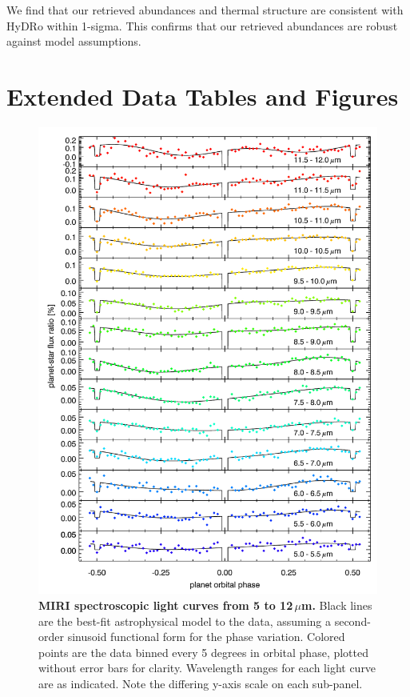 \documentclass[pdflatex,sn-standardnature]{sn-jnl}%
\begin{document}
We find that our retrieved abundances and thermal structure are consistent with HyDRo within 1-sigma. This confirms that our retrieved abundances are robust against model assumptions.





\section*{Extended Data Tables and Figures}

\begin{figure}[h!]
    \centering
\includegraphics[width=\linewidth]{spectral_phase_curves.pdf}
\caption{\textbf{MIRI spectroscopic light curves from 5 to 12\,$\mu$m.} Black lines are the best-fit astrophysical model to the data, assuming a second-order sinusoid functional form for the phase variation.  Colored points are the data binned every 5 degrees in orbital phase, plotted without error bars for clarity.  Wavelength ranges for each light curve are as indicated.  Note the differing y-axis scale on each sub-panel.}
    \label{fig:spectroscopic_lc} 
\end{figure}
\end{document}
